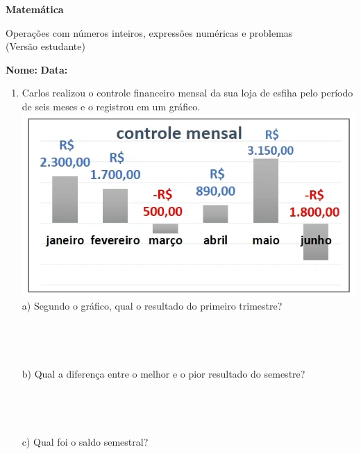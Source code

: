 \documentclass[a4paper,14pt]{article}
\begin{document}
	
	\noindent\textbf{Matemática} 
	
	\begin{center}Operações com números inteiros, expressões numéricas e problemas \\ (Versão estudante)
	\end{center}
	
	\noindent\textbf{Nome:} \underline{\hspace{10cm}}
	\noindent\textbf{Data:} \underline{\hspace{4cm}}
	
	
	
    \begin{multicols}{2}
		\begin{enumerate}
			\item Carlos realizou o controle financeiro mensal da sua loja de esfiha pelo período de seis meses e o registrou em um gráfico.
			\includegraphics[width=1\linewidth]{Leonardo_imagens/imagem1}
			a) Segundo o gráfico, qual o resultado do primeiro trimestre?\\\\\\\\\\
			
			b) Qual a diferença entre o melhor e o pior resultado do semestre?\\\\\\\\\\
			
			c) Qual foi o saldo semestral?\\\\\\\\\\\\\\
			

\end{enumerate}
\end{multicols}
\end{document}

